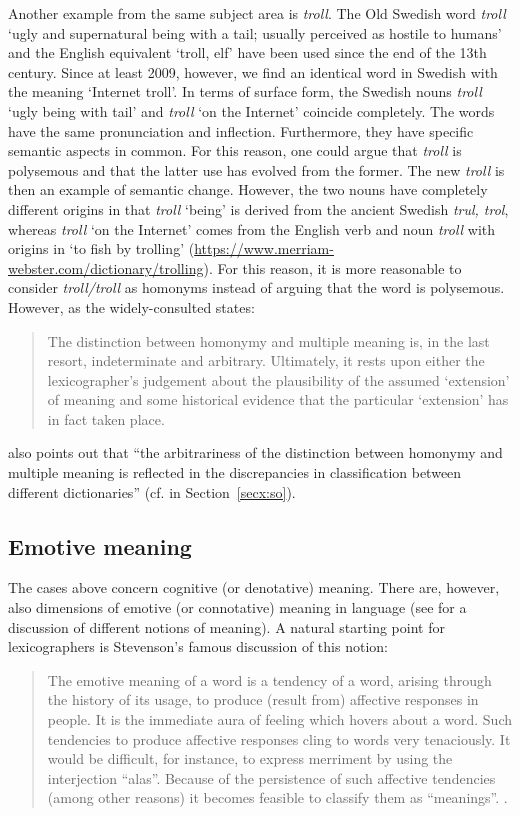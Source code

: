 \documentclass[output=paper]{langscibook}
\begin{document}
Another example from the same subject area is \emph{troll}. The Old Swedish word \emph{troll} `ugly and supernatural being with a tail; usually perceived as hostile to humans' and the English equivalent `troll, elf' have been used since the end of the 13th century. Since at least 2009, however, we find an identical word in Swedish with the meaning `Internet troll'. In terms of surface form, the Swedish nouns \emph{troll} `ugly being with tail' and \emph{troll} `on the Internet' coincide completely. The words have the same pronunciation and inflection. Furthermore, they have specific semantic aspects in common. For this reason, one could argue that \emph{troll} is polysemous and that the latter use has evolved from the former. The new \emph{troll} is then an example of semantic change. However, the two nouns have completely different origins in that \emph{troll} `being' is derived from the ancient Swedish \emph{trul, trol}, whereas  \emph{troll} `on the Internet' comes from the English verb and noun \emph{troll} with origins in `to fish by trolling' (\url{https://www.merriam-webster.com/dictionary/trolling}). For this reason, it is more reasonable to consider \emph{troll/troll} as homonyms instead of arguing that the word is polysemous. However, as the widely-consulted \citet[406]{lyons1968} states:
\begin{quote}
   The distinction between homonymy and multiple meaning is, in the last resort, indeterminate and arbitrary. Ultimately, it rests upon either the lexicographer's judgement about the plausibility of the assumed `extension' of meaning and some historical evidence that the particular `extension' has in fact taken place. 
\end{quote}

\citet[406]{lyons1968} also points out that ``the arbitrariness of the distinction between homonymy and multiple meaning is reflected in the discrepancies in classification between different dictionaries'' (cf. \citealt{svensen2009} in Section~\ref{secx:so}).

\subsection{Emotive meaning}
The cases above concern cognitive (or denotative) meaning. There are, however, also dimensions of emotive (or connotative) meaning in language (see \citealt[214]{svensen2009} for a discussion of different notions of meaning). A natural starting point for lexicographers is Stevenson's famous discussion of this notion:
\begin{quote}
    The emotive meaning of a word is a tendency of a word, arising through the history of its usage, to produce (result from) affective responses in people. It is the immediate aura of feeling which hovers about a word. Such tendencies to produce affective responses cling to words very tenaciously. It would be difficult, for instance, to express merriment by using the interjection ``alas''. Because of the persistence of such affective tendencies (among other reasons) it becomes feasible to classify them as ``meanings''. \citep[23]{stevenson1937}.
\end{quote}
\end{document}
